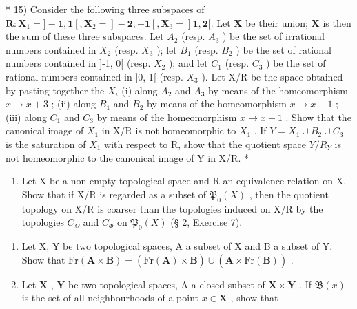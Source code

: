* 15) Consider the following three subspaces of \(\mathbf{R}: \mathbf{X}_1 = ] - \mathbf{1}, \mathbf{1}[, \mathbf{X}_2 = ] - \mathbf{2}, -\mathbf{1}[, \mathbf{X}_3 = ]\mathbf{1}, \mathbf{2}[.\) Let \(\mathbf{X}\) be their union; \(\mathbf{X}\) is then the sum of these three subspaces. Let \(A_{2}\) (resp. \(A_{3}\) ) be the set of irrational numbers contained in \(X_{2}\) (resp. \(X_{3}\) ); let \(B_{1}\) (resp. \(B_{2}\) ) be the set of rational numbers contained in {]}-1, 0{[} (resp. \(X_{2}\) ); and let \(C_{1}\) (resp. \(C_{3}\) ) be the set of rational numbers contained in {]}0, 1{[} (resp. \(X_{3}\) ). Let X/R be the space obtained by pasting together the \(X_{i}\) (i) along \(A_{2}\) and \(A_{3}\) by means of the homeomorphism \(x \to x + 3\) ; (ii) along \(B_{1}\) and \(B_{2}\) by means of the homeomorphism \(x \to x - 1\) ; (iii) along \(C_{1}\) and \(C_{3}\) by means of the homeomorphism \(x \to x + 1\) . Show that the canonical image of \(X_{1}\) in X/R is not homeomorphic to \(X_{1}\) . If \(Y = X_{1} \cup B_{2} \cup C_{3}\) is the saturation of \(X_{1}\) with respect to R, show that the quotient space \(Y/R_{Y}\) is not homeomorphic to the canonical image of Y in X/R. *

\begin{enumerate}
\def\labelenumi{\arabic{enumi})}
\setcounter{enumi}{15}
\tightlist
\item
  Let X be a non-empty topological space and R an equivalence relation on X. Show that if X/R is regarded as a subset of \(\mathfrak{P}_{0}(X)\) , then the quotient topology on X/R is coarser than the topologies induced on X/R by the topologies \(C_{\Omega}\) and \(C_{\Phi}\) on \(\mathfrak{P}_{0}(X)\) (§ 2, Exercise 7).
\end{enumerate}

\BourbakiExerciseGroup

\begin{enumerate}
\def\labelenumi{\arabic{enumi})}
\item
  Let X, Y be two topological spaces, A a subset of X and B a subset of Y. Show that \(\mathrm{Fr}(\mathbf{A} \times \mathbf{B}) = (\mathrm{Fr}(\mathbf{A}) \times \overline{\mathbf{B}}) \cup (\overline{\mathbf{A}} \times \mathrm{Fr}(\mathbf{B}))\) .
\item
  Let \(\mathbf{X}\) , \(\mathbf{Y}\) be two topological spaces, A a closed subset of \(\mathbf{X} \times \mathbf{Y}\) . If \(\mathfrak{B}(x)\) is the set of all neighbourhoods of a point \(x \in \mathbf{X}\) , show that
\end{enumerate}

